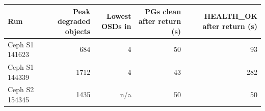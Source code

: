 \begin{tabular}{lrrrr}
\toprule
Run & Peak degraded objects & Lowest OSDs in & PGs clean after return (s) & HEALTH\_OK after return (s) \\
\midrule
Ceph S1 141623 & 684 & 4 & 50 & 93 \\
Ceph S1 144339 & 1712 & 4 & 43 & 282 \\
Ceph S2 154345 & 1435 & n/a & 50 & 50 \\
\bottomrule
\end{tabular}

